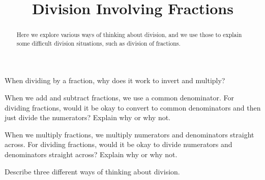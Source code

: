 \documentclass[handout]{ximera}
\title{Division Involving Fractions}
\begin{document}
\begin{abstract}
Here we explore various ways of thinking about division, and we use those to explain some difficult division situations, such as division of fractions.
\end{abstract}
\maketitle


\begin{problem}[3in]
When dividing by a fraction, why does it work to invert and multiply?
\begin{freeResponse}
\end{freeResponse}
\end{problem}

\begin{problem}[3in]
When we add and subtract fractions, we use a common denominator.  For dividing fractions, would it be okay to convert to common denominators and then just divide the numerators?  Explain why or why not. 
\begin{freeResponse}
\end{freeResponse}
\end{problem}


\begin{problem}[3in]
When we multiply fractions, we multiply numerators and denominators straight across.  For dividing fractions, would it be okay to divide numerators and denominators straight across?  Explain why or why not. 
\begin{freeResponse}
\end{freeResponse}
\end{problem}


\begin{problem}[3in]
Describe three different ways of thinking about division.
\begin{freeResponse}
\end{freeResponse}

\end{problem}

\end{document}
